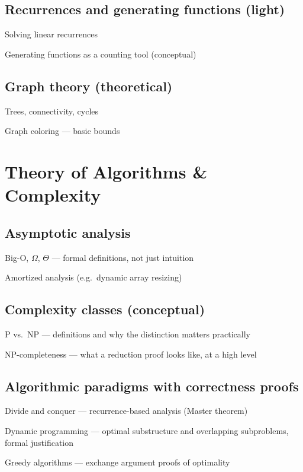 \subsection{Recurrences and generating functions (light)}
\begin{tasklist}
    \item Solving linear recurrences
    \item Generating functions as a counting tool (conceptual)
\end{tasklist}

\subsection{Graph theory (theoretical)}
\begin{tasklist}
    \item Trees, connectivity, cycles
    \item Graph coloring — basic bounds
\end{tasklist}

\section{Theory of Algorithms \& Complexity}

\subsection{Asymptotic analysis}
\begin{tasklist}
    \item Big-O, $\Omega$, $\Theta$ — formal definitions, not just intuition
    \item Amortized analysis (e.g.\ dynamic array resizing)
\end{tasklist}

\subsection{Complexity classes (conceptual)}
\begin{tasklist}
    \item P vs.\ NP — definitions and why the distinction matters practically
    \item NP-completeness — what a reduction proof looks like, at a high level
\end{tasklist}

\subsection{Algorithmic paradigms with correctness proofs}
\begin{tasklist}
    \item Divide and conquer — recurrence-based analysis (Master theorem)
    \item Dynamic programming — optimal substructure and overlapping subproblems, formal justification
    \item Greedy algorithms — exchange argument proofs of optimality
\end{tasklist}

